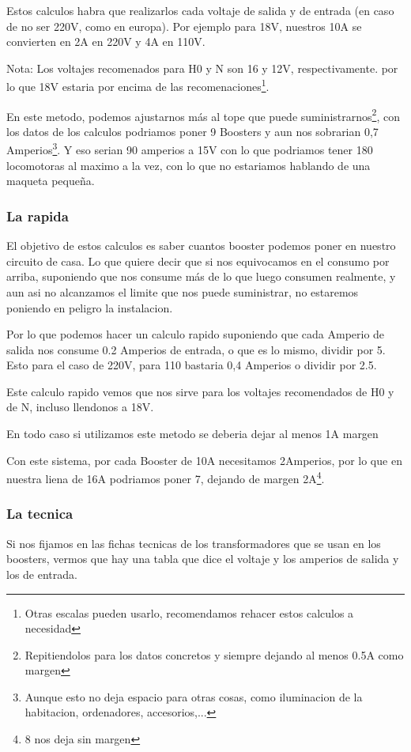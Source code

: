 Estos calculos habra que realizarlos cada voltaje de salida y de entrada (en caso de no ser 220V, como en europa). Por ejemplo para 18V, nuestros 10A se convierten en 2A en 220V y 4A en 110V.

Nota: Los voltajes recomenados para H0 y N son 16 y 12V, respectivamente. por lo que 18V estaria por encima de las recomenaciones\footnote{Otras escalas pueden usarlo, recomendamos rehacer estos calculos a necesidad}.

En este metodo, podemos ajustarnos más al tope que puede suministrarnos\footnote{Repitiendolos para los datos concretos y siempre dejando al menos 0.5A como margen}, con los datos de los calculos podriamos poner 9 Boosters y aun nos sobrarian 0,7 Amperios\footnote{Aunque esto no deja espacio para otras cosas, como iluminacion de la habitacion, ordenadores, accesorios,...}. Y eso serian 90 amperios a 15V con lo que podriamos tener 180 locomotoras al maximo a la vez, con lo que no estariamos hablando de una maqueta pequeña.

\subsubsection{La rapida}

El objetivo de estos calculos es saber cuantos booster podemos poner en nuestro circuito de casa. Lo que quiere decir que si nos equivocamos en el consumo por arriba, suponiendo que nos consume más de lo que luego consumen realmente, y aun asi no alcanzamos el limite que nos puede suministrar, no estaremos poniendo en peligro la instalacion.

Por lo que podemos hacer un calculo rapido suponiendo que cada Amperio de salida nos consume 0.2 Amperios de entrada, o que es lo mismo, dividir por 5. Esto para el caso de 220V, para 110 bastaria 0,4 Amperios o dividir por 2.5. 

Este calculo rapido vemos que nos sirve para los voltajes recomendados de H0 y de N, incluso llendonos a 18V.

En todo caso si utilizamos este metodo se deberia dejar al menos 1A margen

Con este sistema, por cada Booster de 10A necesitamos 2Amperios, por lo que en nuestra liena de 16A podriamos poner 7, dejando de margen 2A\footnote{8 nos deja sin margen}.

\subsubsection{La tecnica}
Si nos fijamos en las fichas tecnicas de los transformadores que se usan en los boosters, vermos que hay una tabla que dice el voltaje y los amperios de salida y los de entrada.

